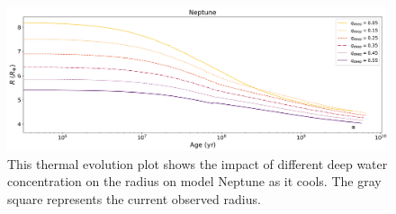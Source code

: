 \documentclass[11pt]{ucscthesisbs}
\begin{document}
{{\begin{figure}[ht]
 \centerline{
  \includegraphics[scale=0.45]{figures/n_cooling_radius_nz_4096_logx.png}
 }
\caption[Thermal Evolution Curves for Neptune - Radius]
{This thermal evolution plot shows the impact of different deep water concentration on the radius on model Neptune as it cools. The gray square represents the current observed radius.}
\label{fig:evolve_neptune_radius}
\end{figure}



}}
\end{document}
